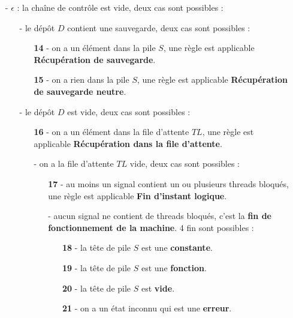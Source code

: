 \documentclass[10pt,a4paper]{report}
\begin{document}
\begin{enumerate}
		\item[-] $\epsilon$ : la chaîne de contrôle est vide, deux cas sont possibles :
		\begin{enumerate}
			\item[-] le dépôt $D$ contient une sauvegarde, deux cas sont possibles :
			\begin{enumerate}
				\item[\textbf{14} -] on a un élément dans la pile $S$, une règle est applicable \textbf{Récupération de sauvegarde}.
				\item[\textbf{15} -] on a rien dans la pile $S$, une règle est applicable \textbf{Récupération de sauvegarde neutre}.  
			\end{enumerate}
			\item[-] le dépôt $D$ est vide, deux cas sont possibles :
			\begin{enumerate}
				\item[\textbf{16} -] on a un élément dans la file d'attente $TL$, une règle est applicable \textbf{Récupération dans la file d'attente}.
				\item[-] on a la file d'attente $TL$ vide, deux cas sont possibles :
				\begin{enumerate}
					\item[\textbf{17} -] au moins un signal contient un ou plusieurs threads bloqués, une règle est applicable \textbf{Fin d'instant logique}.
					\item[-] aucun signal ne contient de threads bloqués, c'est la \textbf{fin de fonctionnement de la machine}. 4 fin sont possibles :
					\begin{itemize}
						\item[\textbf{18} -] la tête de pile $S$ est une \textbf{constante}.
						\item[\textbf{19} -] la tête de pile $S$ est une \textbf{fonction}.
						\item[\textbf{20} -] la tête de pile $S$ est \textbf{vide}.
						\item[\textbf{21} -] on a un état inconnu qui est une \textbf{erreur}.
					\end{itemize}	   	
				\end{enumerate}
			\end{enumerate}
		\end{enumerate}
	\end{enumerate}
	\newpage
	
	
	

	

	\newpage
	
\end{document}
